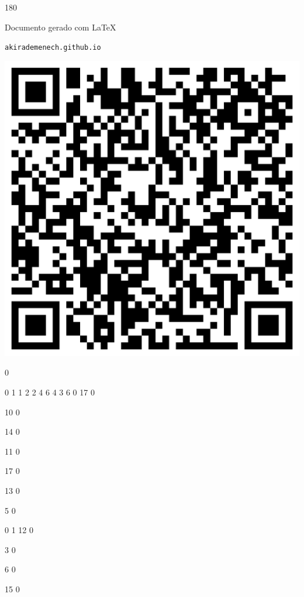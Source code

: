 \documentclass[12pt]{article}
\begin{document}
	\begin{turn}{180}	
		\begin{minipage}{\textwidth}		  
		  Documento gerado com \LaTeX			
		  
		  \texttt{akirademenech.github.io}

		  \includegraphics[height=0.3\textheight]{2e-2.pdf}

		\end{minipage}	
	\end{turn}  
		  
		\vfill  
		  
{
	0	%

	0	%
	1	%
	1	%
	2	%
	2	%
	4	%
	6	%
	4	%
	3	%
	6	%
	0	%
	17	%
	0	%

	10	%
	0	%

	14	%
	0	%

	11	%
	0	%

	17	%
	0	%

	13	%
	0	%

	5	%
	0	%

	0	%
	1	%
	12	%
	0	%

	3	%
	0	%

	6	%
	0	%

	15	%
	0	%

}	  
		    	
\end{document}

